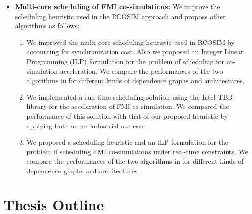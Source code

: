 \begin{itemize}
\begin{enumerate}
\setcounter{enumTemp}{\theenumi}

\end{enumerate}

\item \textbf{Multi-core scheduling of FMI co-simulations:} We improve the scheduling heuristic used in the RCOSIM approach and propose other algorithms as follows:

\begin{enumerate}

\setcounter{enumi}{\theenumTemp}

\item We improved the multi-core scheduling heuristic used in RCOSIM by accounting for synchronization cost. Also we proposed an Integer Linear Programming (ILP) formulation for the problem of scheduling for co-simulation acceleration. We compare the performances of the two algorithms in for different kinds of dependence graphs and architectures.

\item We implemented a run-time scheduling solution using the Intel TBB library for the acceleration of FMI co-simulation. We compared the performance of this solution with that of our proposed heuristic by applying both on an industrial use case.

\item We proposed a scheduling heuristic and an ILP formulation for the problem if scheduling FMI co-simulations under real-time constraints. We compare the performances of the two algorithms in for different kinds of dependence graphs and architectures.   

\end{enumerate}

\end{itemize}

\section{Thesis Outline}